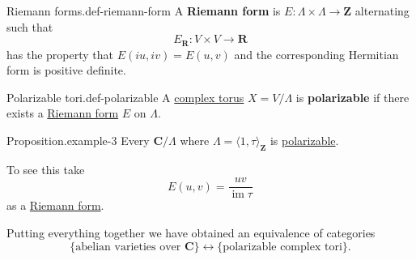 \documentclass[10pt,]{book}
\newcommand{\terminology}[1]{\textbf{#1}}
\numberwithin{equation}{section}
\newcommand{\ZZ}{\mathbf{Z}}
\newcommand{\RR}{\mathbf{R}}
\newcommand{\CC}{\mathbf{C}}
\DeclareMathOperator{\im}{im}
\begin{document}
\begin{definition}{Riemann forms.}{def-riemann-form}%
\hypertarget{p-71}{}%
A \terminology{Riemann form} is \(E\colon \Lambda \times \Lambda \to \ZZ\) alternating such that%
\begin{equation*}
E_\RR \colon V\times V\to \RR
\end{equation*}
has the property that \(E(iu,iv) = E(u,v)\) and  the corresponding Hermitian form is positive definite.%
\end{definition}
\begin{definition}{Polarizable tori.}{def-polarizable}%
\hypertarget{p-72}{}%
A \hyperref[def-complex-torus]{complex torus} \(X = V/\Lambda\) is \terminology{polarizable} if there exists a \hyperref[def-riemann-form]{Riemann form} \(E\) on \(\Lambda\).%
\end{definition}
\begin{example}{Proposition.}{example-3}%
\hypertarget{p-73}{}%
Every \(\CC/\Lambda\) where \(\Lambda = \langle 1,\tau\rangle_{\ZZ}\) is \hyperref[def-polarizable]{polarizable}.%
\par
\hypertarget{p-74}{}%
To see this take%
\begin{equation*}
E(u,v) = \frac{uv}{\im \tau}
\end{equation*}
as a \hyperref[def-riemann-form]{Riemann form}.%
\end{example}
\hypertarget{p-75}{}%
Putting everything together we have obtained an equivalence of categories%
\begin{equation*}
\{\text{abelian varieties over } \CC\} \leftrightarrow \{\text{polarizable complex tori}\}\text{.}
\end{equation*}
%
%
%
\typeout{************************************************}
\typeout{************************************************}
%
\end{document}
